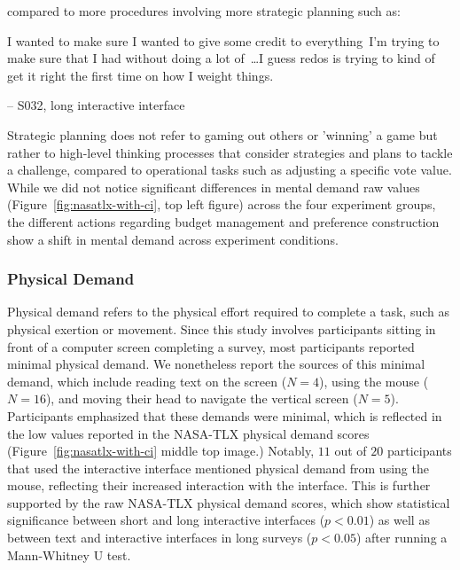 compared to more procedures involving more strategic planning such as:

\begin{displayquote}
I wanted to make sure I wanted to give some credit to everything~\bracketellipsis I'm trying to make sure that I had without doing a lot of~\ldots I guess redos is trying to kind of get it right the first time on how I weight things.

\noindent \hfill -- S032, long interactive interface
\end{displayquote}

Strategic planning does not refer to gaming out others or 'winning' a game but rather to high-level thinking processes that consider strategies and plans to tackle a challenge, compared to operational tasks such as adjusting a specific vote value. While we did not notice significant differences in mental demand raw values (Figure~\ref{fig:nasatlx-with-ci}, top left figure) across the four experiment groups, the different actions regarding budget management and preference construction show a shift in mental demand across experiment conditions.


\subsubsection{Physical Demand} Physical demand refers to the physical effort required to complete a task, such as physical exertion or movement. Since this study involves participants sitting in front of a computer screen completing a survey, most participants reported minimal physical demand. We nonetheless report the sources of this minimal demand, which include reading text on the screen ($N=4$), using the mouse ($N=16$), and moving their head to navigate the vertical screen ($N=5$). Participants emphasized that these demands were minimal, which is reflected in the low values reported in the NASA-TLX physical demand scores (Figure~\ref{fig:nasatlx-with-ci} middle top image.)
Notably, $11$ out of $20$ participants that used the interactive interface mentioned physical demand from using the mouse, reflecting their increased interaction with the interface. This is further supported by the raw NASA-TLX physical demand scores, which show statistical significance between short and long interactive interfaces ($p<0.01$) as well as between text and interactive interfaces in long surveys ($p<0.05$) after running a Mann-Whitney U test.

